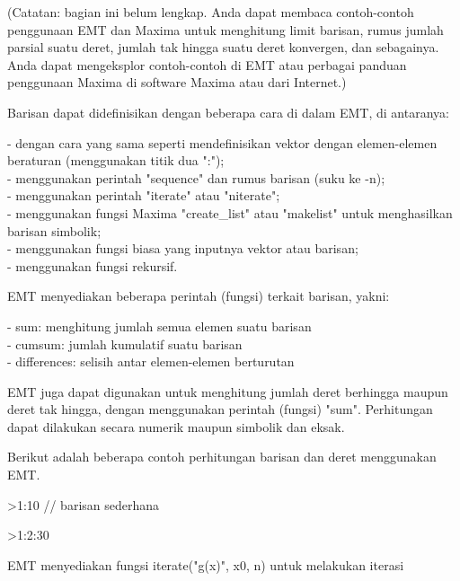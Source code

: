 \documentclass{article}
\begin{document}
\begin{eulernotebook}
\begin{eulercomment}
\begin{eulercomment}
\begin{eulercomment}
\begin{eulercomment}
\begin{eulercomment}
\begin{eulercomment}
\begin{eulercomment}
\begin{eulercomment}
\begin{eulerudf}
\end{eulerudf}
\begin{eulercomment}
(Catatan: bagian ini belum lengkap. Anda dapat membaca contoh-contoh
penggunaan EMT dan Maxima untuk menghitung limit barisan, rumus jumlah
parsial suatu deret, jumlah tak hingga suatu deret konvergen, dan
sebagainya. Anda dapat mengeksplor contoh-contoh di EMT atau perbagai
panduan penggunaan Maxima di software Maxima atau dari Internet.)

Barisan dapat didefinisikan dengan beberapa cara di dalam EMT, di
antaranya:

- dengan cara yang sama seperti mendefinisikan vektor dengan
elemen-elemen beraturan (menggunakan titik dua ":");\\
- menggunakan perintah "sequence" dan rumus barisan (suku ke -n);\\
- menggunakan perintah "iterate" atau "niterate";\\
- menggunakan fungsi Maxima "create\_list" atau "makelist" untuk
menghasilkan barisan simbolik;\\
- menggunakan fungsi biasa yang inputnya vektor atau barisan;\\
- menggunakan fungsi rekursif.

EMT menyediakan beberapa perintah (fungsi) terkait barisan, yakni:

- sum: menghitung jumlah semua elemen suatu barisan\\
- cumsum: jumlah kumulatif suatu barisan\\
- differences: selisih antar elemen-elemen berturutan

EMT juga dapat digunakan untuk menghitung jumlah deret berhingga
maupun deret tak hingga, dengan menggunakan perintah (fungsi) "sum".
Perhitungan dapat dilakukan secara numerik maupun simbolik dan eksak.

Berikut adalah beberapa contoh perhitungan barisan dan deret
menggunakan EMT.
\end{eulercomment}
\begin{eulerprompt}
>1:10 // barisan sederhana
\end{eulerprompt}
\begin{euleroutput}
  [1,  2,  3,  4,  5,  6,  7,  8,  9,  10]
\end{euleroutput}
\begin{eulerprompt}
>1:2:30
\end{eulerprompt}
\begin{euleroutput}
  [1,  3,  5,  7,  9,  11,  13,  15,  17,  19,  21,  23,  25,  27,  29]
\end{euleroutput}
\begin{eulercomment}
EMT menyediakan fungsi iterate("g(x)", x0, n) untuk melakukan iterasi


\end{eulercomment}
\end{eulercomment}
\end{eulercomment}
\end{eulercomment}
\end{eulercomment}
\end{eulercomment}
\end{eulercomment}
\end{eulercomment}
\end{eulercomment}
\end{eulernotebook}
\end{document}
